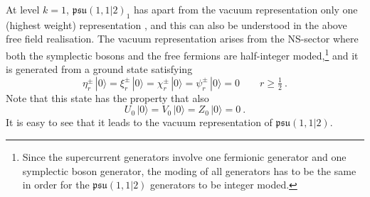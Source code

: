 \documentclass[a4paper,11pt]{article}
\numberwithin{equation}{section}
\def\be{\begin{equation}}
\def\ee{\end{equation}}
\begin{document}
At level $k=1$, $\mathfrak{psu}(1,1|2)_1$ has apart from the vacuum representation only one (highest weight) representation \cite{Eberhardt:2018ouy}, and this can also be understood in the above free field realisation. The vacuum representation arises from the NS-sector where both the symplectic bosons and the free fermions are half-integer moded,\footnote{Since the supercurrent generators involve one fermionic generator and one symplectic boson generator, the moding of all generators has to be the same in order for the $\mathfrak{psu}(1,1|2)$ generators to be integer moded.} and it is generated from a ground state satisfying 
\be
\eta^\pm_r \, |0\rangle = \xi^\pm_r \, |0\rangle = \chi^\pm_r \, |0\rangle = \psi^\pm_r \, |0\rangle = 0 \qquad r \geq \tfrac{1}{2} \ . 
\ee
Note that this state has the property that also 
\be
U_0 \, |0\rangle = V_0 \, |0\rangle = Z_0\,  |0\rangle = 0 \ . 
\ee
It is easy to see that it leads to the vacuum representation of $\mathfrak{psu}(1,1|2)$. 
\medskip
\end{document}
